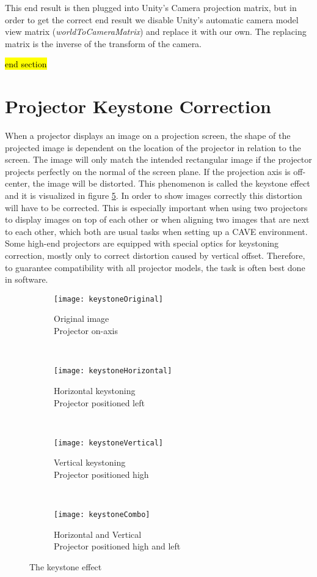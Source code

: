 \documentclass[12pt,a4paper,oneside,pdftex]{report}
\begin{document}
This end result is then plugged into Unity's Camera projection matrix, but in order to get the correct end result we disable Unity's automatic camera model view matrix (\emph{worldToCameraMatrix}) and replace it with our own. The replacing matrix is the inverse of the transform of the camera.

\hl{end section}

\section{Projector Keystone Correction}
\label{section:keystonecorrection}

When a projector displays an image on a projection screen, the shape of the projected image is dependent on the location of the projector in relation to the screen. The image will only match the intended rectangular image if the projector projects perfectly on the normal of the screen plane. If the projection axis is off-center, the image will be distorted. This phenomenon is called the keystone effect and it is visualized in figure \ref{fig:keystoneEffect}. In order to show images correctly this distortion will have to be corrected. This is especially important when using two projectors to display images on top of each other or when aligning two images that are next to each other, which both are usual tasks when setting up a CAVE environment. Some high-end projectors are equipped with special optics for keystoning correction, mostly only to correct distortion caused by vertical offset. Therefore, to guarantee compatibility with all projector models, the task is often best done in software.

\begin{figure}
    \centering
    \begin{subfigure}[b]{0.4\textwidth}
        \texttt{[image: keystoneOriginal]}
        \caption{Original image\\Projector on-axis}
        \label{subfig:keystoneOriginal}
    \end{subfigure}
    ~
    \begin{subfigure}[b]{0.4\textwidth}
        \texttt{[image: keystoneHorizontal]}
        \caption{Horizontal keystoning\\Projector positioned left}
        \label{subfig:keystoneHorizontal}
    \end{subfigure}
    \\[0.3em]
    \begin{subfigure}[b]{0.4\textwidth}
        \texttt{[image: keystoneVertical]}
        \caption{Vertical keystoning\\Projector positioned high}
        \label{subfig:keystoneVertical}
    \end{subfigure}
    ~
    \begin{subfigure}[b]{0.4\textwidth}
        \texttt{[image: keystoneCombo]}
        \caption{Horizontal and Vertical\\Projector positioned high and left}
        \label{subfig:keystoneCombo}
    \end{subfigure}
    \caption{The keystone effect} \label{fig:keystoneEffect}
\end{figure}
\end{document}
